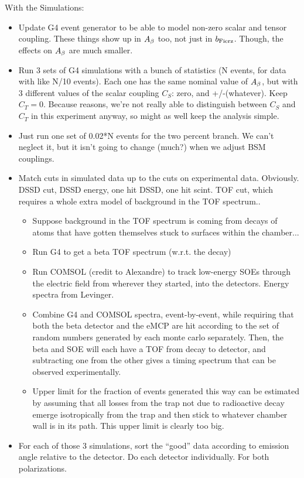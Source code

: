 \vspace{24pt}
\vspace{12pt}
With the Simulations:
\begin{itemize}
	\item Update G4 event generator to be able to model non-zero scalar and tensor coupling.  These things show up in $A_{\beta}$ too, not just in $b_{\mathrm{Fierz}}$.  Though, the effects on $A_{\beta}$ are much smaller.
	\item Run 3 sets of G4 simulations with a bunch of statistics (N events, for data with like N/10 events).  Each one has the same nominal value of $A_{\beta}$, but with 3 different values of the scalar coupling $C_S$:  zero, and +/-(whatever).  Keep $C_T=0$.  Because reasons, we're not really able to distinguish between $C_S$ and $C_T$ in this experiment anyway, so might as well keep the analysis simple.
	\item Just run one set of 0.02*N events for the two percent branch.  We can't neglect it, but it isn't going to change (much?) when we adjust BSM couplings.
	\item Match cuts in simulated data up to the cuts on experimental data.  Obviously.  DSSD cut, DSSD energy, one hit DSSD, one hit scint.  TOF cut, which requires a whole extra model of background in the TOF spectrum..
		\begin{itemize}
		\item Suppose background in the TOF spectrum is coming from decays of atoms that have gotten themselves stuck to surfaces within the chamber...
		\item Run G4 to get a beta TOF spectrum (w.r.t. the decay)
		\item Run COMSOL (credit to Alexandre) to track low-energy SOEs through the electric field from wherever they started, into the detectors.  Energy spectra from Levinger.
		\item Combine G4 and COMSOL spectra, event-by-event, while requiring that both the beta detector and the eMCP are hit according to the set of random numbers generated by each monte carlo separately.  Then, the beta and SOE will each have a TOF from decay to detector, and subtracting one from the other gives a timing spectrum that can be observed experimentally.  
		\item Upper limit for the fraction of events generated this way can be estimated by assuming that all losses from the trap not due to radioactive decay emerge isotropically from the trap and then stick to whatever chamber wall is in its path.  This upper limit is clearly too big.  
		\end{itemize}
	\item For each of those 3 simulations, sort the ``good'' data according to emission angle relative to the detector.  Do each detector individually.  For both polarizations.
	
\end{itemize}

